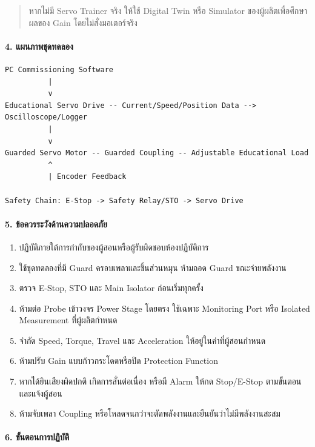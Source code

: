 \begin{quote}
หากไม่มี Servo Trainer จริง ให้ใช้ Digital Twin หรือ Simulator ของผู้ผลิตเพื่อศึกษาผลของ Gain โดยไม่สั่งมอเตอร์จริง
\end{quote}

\paragraph{4. แผนภาพชุดทดลอง}

\begin{verbatim}
PC Commissioning Software
          |
          v
Educational Servo Drive -- Current/Speed/Position Data --> Oscilloscope/Logger
          |
          v
Guarded Servo Motor -- Guarded Coupling -- Adjustable Educational Load
          ^
          | Encoder Feedback

Safety Chain: E-Stop -> Safety Relay/STO -> Servo Drive
\end{verbatim}

\paragraph{5. ข้อควรระวังด้านความปลอดภัย}

\begin{enumerate}
    \item ปฏิบัติภายใต้การกำกับของผู้สอนหรือผู้รับผิดชอบห้องปฏิบัติการ
    \item ใช้ชุดทดลองที่มี Guard ครอบเพลาและชิ้นส่วนหมุน ห้ามถอด Guard ขณะจ่ายพลังงาน
    \item ตรวจ E-Stop, STO และ Main Isolator ก่อนเริ่มทุกครั้ง
    \item ห้ามต่อ Probe เข้าวงจร Power Stage โดยตรง ใช้เฉพาะ Monitoring Port หรือ Isolated Measurement ที่ผู้ผลิตกำหนด
    \item จำกัด Speed, Torque, Travel และ Acceleration ให้อยู่ในค่าที่ผู้สอนกำหนด
    \item ห้ามปรับ Gain แบบก้าวกระโดดหรือปิด Protection Function
    \item หากได้ยินเสียงผิดปกติ เกิดการสั่นต่อเนื่อง หรือมี Alarm ให้กด Stop/E-Stop ตามขั้นตอนและแจ้งผู้สอน
    \item ห้ามจับเพลา Coupling หรือโหลดจนกว่าจะตัดพลังงานและยืนยันว่าไม่มีพลังงานสะสม
\end{enumerate}

\paragraph{6. ขั้นตอนการปฏิบัติ}

